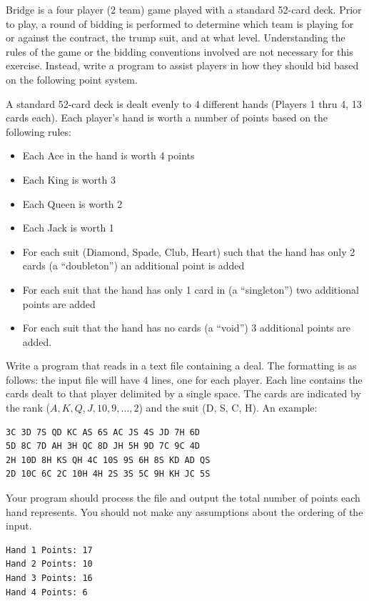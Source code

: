\begin{exer}
Bridge is a four player (2 team) game played with a standard 52-card 
deck.  Prior to play, a round of bidding is performed to determine which 
team is playing for or against the contract, the trump suit, and at what 
level.  Understanding the rules of the game or the bidding conventions 
involved are not necessary for this exercise.  Instead, write a program 
to assist players in how they should bid based on the following point 
system.

A standard 52-card deck is dealt evenly to 4 different hands (Players 
1 thru 4, 13 cards each).  Each player's hand is worth a number of 
points based on the following rules:
\begin{itemize}
  \item Each Ace in the hand is worth 4 points
  \item Each King is worth 3
  \item Each Queen is worth 2
  \item Each Jack is worth 1
  \item For each suit (Diamond, Spade, Club, Heart) such that the hand has only 2 cards (a ``doubleton'') an additional point is added
  \item For each suit that the hand has only 1 card in (a ``singleton'') two additional points are added
  \item For each suit that the hand has no cards (a ``void'') 3 additional points are added.
\end{itemize}
Write a program that reads in a text file containing a deal.  The formatting 
is as follows: the input file will have 4 lines, one for each player.  Each 
line contains the cards dealt to that player delimited by a single space.  
The cards are indicated by the rank ($A, K, Q, J, 10, 9, \ldots, 2$) and 
the suit (D, S, C, H).  An example:

\begin{verbatim}
3C 3D 7S QD KC AS 6S AC JS 4S JD 7H 6D
5D 8C 7D AH 3H QC 8D JH 5H 9D 7C 9C 4D
2H 10D 8H KS QH 4C 10S 9S 6H 8S KD AD QS
2D 10C 6C 2C 10H 4H 2S 3S 5C 9H KH JC 5S
\end{verbatim}

Your program should process the file and output the total number 
of points each hand represents.  You should not make any assumptions 
about the ordering of the input.

\begin{verbatim}
Hand 1 Points: 17
Hand 2 Points: 10
Hand 3 Points: 16
Hand 4 Points: 6
\end{verbatim}
\end{exer}

